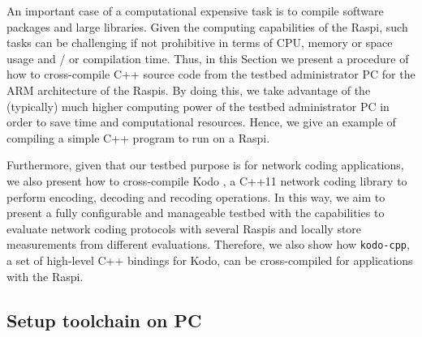 \label{sec:cross_compilation}
An important case of a computational expensive task is to compile software
packages and large libraries. Given the computing capabilities of the
\ac{Raspi}, such tasks can be challenging if not prohibitive in terms of
\ac{CPU}, memory or space usage and / or compilation time. Thus, in
this Section we present a procedure of how to cross-compile C++
source code from the testbed administrator \ac{PC} for the \ac{ARM}
architecture of the \ac{Raspi}s. By doing this, we take advantage
of the (typically) much higher computing power of the testbed
administrator \ac{PC} in order to save time and computational resources.
Hence, we give an example of compiling a simple C++ program to run
on a \ac{Raspi}.

Furthermore, given that our testbed purpose is for
network coding applications, we also present how to cross-compile Kodo
\cite{kodo2011pedersen}, a C++11 network coding library to perform
encoding, decoding and recoding operations. In this way, we aim to present
a fully configurable and manageable testbed with the capabilities to
evaluate network coding protocols with several \ac{Raspi}s and locally
store measurements from different evaluations. Therefore, we also show
how \texttt{kodo-cpp}, a set of high-level C++ bindings for Kodo, can be
cross-compiled for applications with the \ac{Raspi}.



%

\subsection{Setup toolchain on PC}


